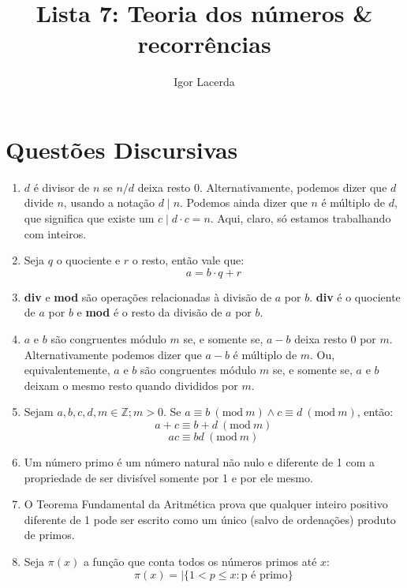 \documentclass{article}
\title{Lista 7: Teoria dos números \& recorrências}
\author{Igor Lacerda}
\newcommand{\Mod}[1]{\ (\mathrm{mod}\ #1)} %
\begin{document}
\maketitle

\section*{Questões Discursivas}

\begin{enumerate}

	\item \( d \) é divisor de \( n \) se \( n / d \) deixa resto 0. Alternativamente, podemos dizer que \( d \) divide \( n \), usando a notação \( d \mid n \). Podemos ainda dizer que \( n \) é múltiplo de \( d \), que significa que existe um \( c \mid d \cdot c = n\). Aqui, claro, só estamos trabalhando com inteiros.

	\item Seja \( q \) o quociente e \( r \) o resto, então vale que:
	      \[ a = b \cdot q + r \]

	\item \textbf{div} e \textbf{mod} são operações relacionadas à divisão de \( a \) por \( b \). \textbf{div} é o quociente de \( a \) por \( b \) e \textbf{mod} é o resto da divisão de \( a \) por \( b \).

	\item \( a \) e \( b \) são congruentes módulo \( m \) se, e somente se, \( a - b \) deixa resto 0 por \( m \). Alternativamente podemos dizer que \( a - b \) é múltiplo de \( m \). Ou, equivalentemente, \( a \) e \( b \) são congruentes módulo \( m \) se, e somente se, \( a \) e \( b \) deixam o mesmo resto quando divididos por \( m \).

	\item Sejam \( a,b,c,d,m \in \mathbb{Z}; m > 0 \). Se \( a \equiv b \Mod{m} \land c \equiv d \Mod{m} \), então:
	      \[ a + c \equiv b + d \Mod{m} \]
	      \[ ac \equiv bd \Mod{m} \]

	\item Um número primo é um número natural não nulo e diferente de 1 com a propriedade de ser divisível somente por 1 e por ele mesmo.

	\item O Teorema Fundamental da Aritmética prova que qualquer inteiro positivo diferente de 1 pode ser escrito como um único (salvo de ordenações) produto de primos.

	\item Seja \( \pi(x) \) a função que conta todos os números primos até \( x \):
	      \[ \pi(x) = \mid \{ 1 < p \leq x : \textrm{p é primo} \} \]


\end{enumerate}
\end{document}
